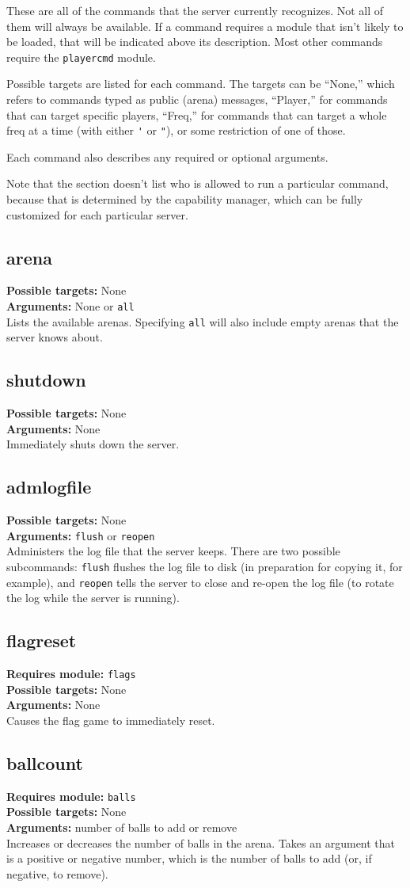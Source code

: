 \documentclass{article}
\newcommand{\requiremod}[1]{\noindent\textbf{Requires module:} \texttt{#1}\\}
\newcommand{\targets}[1]{\noindent\textbf{Possible targets:} #1\\}
\newcommand{\args}[1]{\noindent\textbf{Arguments:} #1\\}
\begin{document}
These are all of the commands that the server currently recognizes. Not
all of them will always be available. If a command requires a module
that isn't likely to be loaded, that will be indicated above its
description. Most other commands require the \texttt{playercmd} module.

Possible targets are listed for each command. The targets can be
``None,'' which refers to commands typed as public (arena) messages,
``Player,'' for commands that can target specific players, ``Freq,'' for
commands that can target a whole freq at a time (with either \verb/'/ or
\verb/"/), or some restriction of one of those.

Each command also describes any required or optional arguments.

Note that the section doesn't list who is allowed to run a particular
command, because that is determined by the capability manager, which can
be fully customized for each particular server.

\subsection{arena}
\targets{None}
\args{None or \texttt{all}}
Lists the available arenas. Specifying \texttt{all} will also include
empty arenas that the server knows about.

\subsection{shutdown}
\targets{None}
\args{None}
Immediately shuts down the server.

\subsection{admlogfile}
\targets{None}
\args{\texttt{flush} or \texttt{reopen}}
Administers the log file that the server keeps. There are two possible
subcommands: \verb/flush/ flushes the log file to disk (in preparation
for copying it, for example), and \verb/reopen/ tells the server to
close and re-open the log file (to rotate the log while the server is
running).

\subsection{flagreset}
\requiremod{flags}
\targets{None}
\args{None}
Causes the flag game to immediately reset.

\subsection{ballcount}
\requiremod{balls}
\targets{None}
\args{number of balls to add or remove}
Increases or decreases the number of balls in the arena. Takes an
argument that is a positive or negative number, which is the number of
balls to add (or, if negative, to remove).
\end{document}
